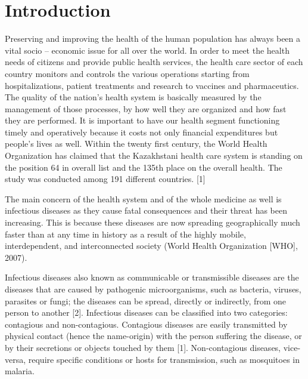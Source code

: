 \chapter*{Introduction}

Preserving and improving the health of the human population has always been a vital socio – economic issue for all over the world. In order to meet the health needs of citizens and provide public health services, the health care sector of each country monitors and controls the various operations starting from hospitalizations, patient treatments and research to vaccines and pharmaceutics. The quality of the nation's health system is basically measured by the management of those processes, by how well they are organized and how fast they are performed. It is important to have our health segment functioning timely and operatively because it costs not only financial expenditures but people's lives as well. Within the twenty first century, the World Health Organization has claimed that the Kazakhstani health care system is standing on the position 64 in overall list and the 135th place on the overall health. The study was conducted among 191 different countries. [1]

The main concern of the health system and of the whole medicine as well is infectious diseases as they cause fatal consequences and their threat has been increasing. This is because these diseases are now spreading geographically much faster than at any time in history as a result of the highly mobile, interdependent, and interconnected society (World Health Organization [WHO], 2007).

Infectious diseases also known as communicable or transmissible diseases are the diseases that are caused by pathogenic microorganisms, such as bacteria, viruses, parasites or fungi; the diseases can be spread, directly or indirectly, from one person to another [2]. Infectious diseases can be classified into two categories: contagious and non-contagious. Contagious diseases are easily transmitted by physical contact (hence the name-origin) with the person suffering the disease, or by their secretions or objects touched by them [1].  Non-contagious diseases, vice-versa, require specific conditions or hosts for transmission, such as mosquitoes in malaria.

